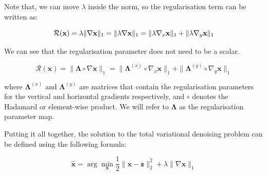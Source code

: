 \documentclass[12pt]{article}
\begin{document}
Note that, we can move $\lambda$ inside the norm, so the regularisation term can be written as:

\begin{equation}
    \mathcal{R}(\mathbf{x}) 
    = \lambda \| \nabla \mathbf{x} \|_1 \\
    = \| \lambda \nabla \mathbf{x} \|_1 \\
    = \| \lambda \nabla_x \mathbf{x} \|_1 + \| \lambda \nabla_y \mathbf{x} \|_1
\end{equation}


We can see that the regularisation parameter does not need to be a scalar.




\begin{equation}
  \mathcal{R}(\mathbf{x}) = \| \mathbf{\Lambda} \circ \nabla \mathbf{x} \|_1
  = \| \mathbf{\Lambda}^{(x)} \circ \nabla_x \mathbf{x} \|_1 + \| \mathbf{\Lambda}^{(y)} \circ \nabla_y \mathbf{x} \|_1
\end{equation}

where $\mathbf{\Lambda}^{(x)}$ and $\mathbf{\Lambda}^{(y)}$ are matrices that contain the regularisation parameters for the vertical and horizontal gradients respectively, and $\circ$ denotes the Hadamard or element-wise product.
We will refer to $\mathbf{\Lambda}$ as the regularisation parameter map.



Putting it all together, 
the solution to the total variational denoising problem
can be 
defined
using the following formula:

\begin{equation}
  \hat{\mathbf{x}} = \arg \min_{\mathbf{x}} \frac{1}{2} \|\mathbf{x} - \mathbf{z}\|_2^2 + \lambda \| \nabla \mathbf{x} \|_1
\end{equation}
\end{document}
